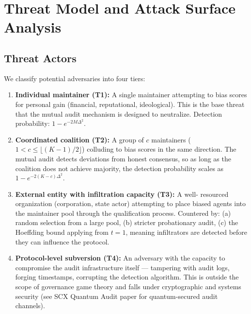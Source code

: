 \documentclass[12pt,a4paper]{article}
\theoremstyle{remark}
\begin{document}
\section{}
\section{Threat Model and Attack Surface Analysis}

\subsection{Threat Actors}

We classify potential adversaries into four tiers:

\begin{enumerate}[label=\textbf{T\arabic*:}, leftmargin=*]
    \item \textbf{Individual maintainer (T1):} A single maintainer attempting to
          bias scores for personal gain (financial, reputational, ideological).
          This is the base threat that the mutual audit mechanism is designed to
          neutralize. Detection probability: $1 - e^{-2M\Delta^2}$.

    \item \textbf{Coordinated coalition (T2):} A group of $c$ maintainers
          ($1 < c \leq \lfloor (K-1)/2 \rfloor$) colluding to bias scores in the
          same direction. The mutual audit detects deviations from honest
          consensus, so as long as the coalition does not achieve majority, the
          detection probability scales as $1 - e^{-2(K-c)\Delta^2}$.

    \item \textbf{External entity with infiltration capacity (T3):} A well-
          resourced organization (corporation, state actor) attempting to place
          biased agents into the maintainer pool through the qualification
          process. Countered by: (a) random selection from a large pool,
          (b) stricter probationary audit, (c) the Hoeffding bound applying
          from $t=1$, meaning infiltrators are detected before they can
          influence the protocol.

    \item \textbf{Protocol-level subversion (T4):} An adversary with the capacity
          to compromise the audit infrastructure itself — tampering with audit
          logs, forging timestamps, corrupting the detection algorithm. This is
          outside the scope of governance game theory and falls under
          cryptographic and systems security (see SCX Quantum Audit paper for
          quantum-secured audit channels).
\end{enumerate}
\end{document}
